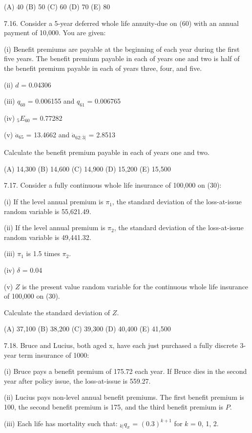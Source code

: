 \documentclass[]{book}
\begin{document}
(A) 40 (B) 50 (C) 60 (D) 70 (E) 80

7.16. Consider a 5-year deferred whole life annuity-due on (60) with an
annual payment of 10,000. You are given:

(i) Benefit premiums are payable at the beginning of each year during
the first five years. The benefit premium payable in each of years one
and two is half of the benefit premium payable in each of years three,
four, and five.

(ii) \(d\) = 0.04306

(iii) \(q_{60}\) = 0.006155 and \(q_{61}\) = 0.006765

(iv) \({}_{5}E_{60}\) = 0.77282

(v) \(\ddot{a}_{65}\) = 13.4662 and \(\ddot{a}_{62:\overline{3}|}\) =
2.8513

Calculate the benefit premium payable in each of years one and two.

(A) 14,300 (B) 14,600 (C) 14,900 (D) 15,200 (E) 15,500

7.17. Consider a fully continuous whole life insurance of 100,000 on
(30):

(i) If the level annual premium is \(\pi_1\), the standard deviation of
the loss-at-issue random variable is 55,621.49.

(ii) If the level annual premium is \(\pi_2\), the standard deviation of
the loss-at-issue random variable is 49,441.32.

(iii) \(\pi_1\) is 1.5 times \(\pi_2\).

(iv) \(\delta\) = 0.04

(v) \(Z\) is the present value random variable for the continuous whole
life insurance of 100,000 on (30).

Calculate the standard deviation of \(Z\).

(A) 37,100 (B) 38,200 (C) 39,300 (D) 40,400 (E) 41,500

7.18. Bruce and Lucius, both aged x, have each just purchased a fully
discrete 3-year term insurance of 1000:

(i) Bruce pays a benefit premium of 175.72 each year. If Bruce dies in
the second year after policy issue, the loss-at-issue is 559.27.

(ii) Lucius pays non-level annual benefit premiums. The first benefit
premium is 100, the second benefit premium is 175, and the third benefit
premium is \(P\).

(iii) Each life has mortality such that: \({}_{k|}q_x\) =
\((0.3)^{k + 1}\) for \(k\) = 0, 1, 2.
\end{document}
